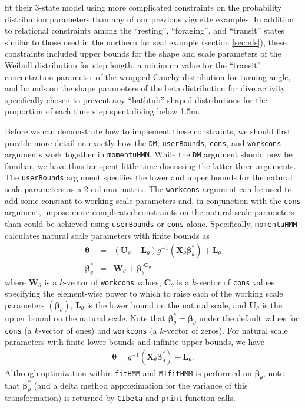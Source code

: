 \documentclass[12pt]{article}\usepackage[]{graphicx}\usepackage[]{color}
\begin{document}
\cite{McClintockEtAl2013c} fit their 3-state model using more complicated constraints on the probability distribution parameters than any of our previous vignette examples. In addition to relational constraints among the ``resting'', ``foraging'', and ``transit'' states similar to those used in the northern fur seal example (section \ref{sec:nfs}), these constraints included upper bounds for the shape and scale parameters of the Weibull distribution for step length, a minimum value for the ``transit'' concentration parameter of the wrapped Cauchy distribution for turning angle, and bounds on the shape parameters of the beta distribution for dive activity specifically chosen to prevent any ``bathtub'' shaped distributions for the proportion of each time step spent diving below 1.5m. 

Before we can demonstrate how to implement these constraints, we should first provide more detail on exactly how the \verb|DM|, \verb|userBounds|, \verb|cons|, and \verb|workcons| arguments work together in \verb|momentuHMM|. While the \verb|DM| argument should now be familiar, we have thus far spent little time discussing the latter three arguments. The \verb|userBounds| argument specifies the lower and upper bounds for the natural scale parameters as a 2-column matrix.  The \verb|workcons| argument can be used to add some constant to working scale parameters and, in conjunction with the \verb|cons| argument, impose more complicated constraints on the natural scale parameters than could be achieved using \verb|userBounds| or \verb|cons| alone. Specifically, \verb|momentuHMM| calculates natural scale parameters with finite bounds as
\begin{eqnarray}
\label{eq:link}
{\boldsymbol \theta} &=&  \left({\mathbf U}_\theta - {\mathbf L}_\theta \right) g^{-1} \left( {\mathbf X}_\theta  {\boldsymbol \beta}_\theta^* \right) + {\mathbf L}_\theta \nonumber \\ 
{\boldsymbol \beta}_\theta^* &=& {\mathbf W}_\theta + {\boldsymbol \beta}_\theta^{\circ {\mathbf C}_\theta}
\end{eqnarray}
where ${\mathbf W}_\theta$ is a $k$-vector of \verb|workcons| values, ${\mathbf C}_\theta$ is a $k$-vector of \verb|cons| values specifying the element-wise power to which to raise each of the working scale parameters $({\boldsymbol \beta}_\theta)$, ${\mathbf L}_\theta$ is the lower bound on the natural scale, and ${\mathbf U}_\theta$ is the upper bound on the natural scale.  Note that ${\boldsymbol \beta}_\theta^*={\boldsymbol \beta}_\theta$ under the default values for \verb|cons| (a $k$-vector of ones) and \verb|workcons| (a $k$-vector of zeros). For natural scale parameters with finite lower bounds and infinite upper bounds, we have
\begin{eqnarray*}
{\boldsymbol \theta} =  g^{-1} \left( {\mathbf X}_\theta  {\boldsymbol \beta}_\theta^* \right) + {\mathbf L}_\theta.
\end{eqnarray*}
Although optimization within \verb|fitHMM| and \verb|MIfitHMM| is performed on ${\boldsymbol \beta}_\theta$, note that ${\boldsymbol \beta}_\theta^*$ (and a delta method approximation for the variance of this transformation) is returned by \verb|CIbeta| and \verb|print| function calls.  
\end{document}
